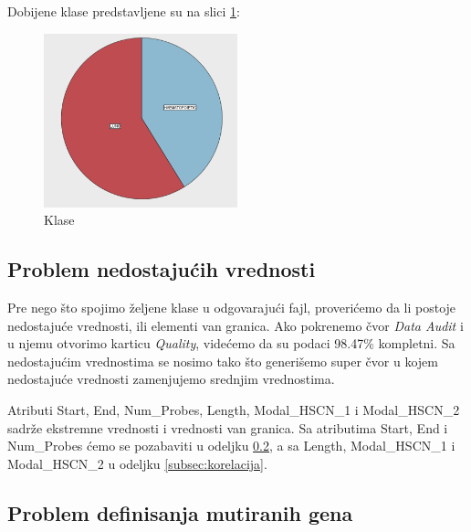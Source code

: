 \documentclass[a4paper]{article}
\begin{document}


Dobijene klase predstavljene su na slici \ref{fig:classes2}:
\begin{figure}[ht!]
                \centering
                \includegraphics[width=0.5\textwidth]{classes_2.PNG}
                \caption{Klase}
                \label{fig:classes2}
            \end{figure}


\subsection{Problem nedostajućih vrednosti}
\label{subsec:nedostajuce}

Pre nego što spojimo željene klase u odgovarajući fajl, proverićemo da li postoje nedostajuće vrednosti, ili elementi van granica. Ako pokrenemo čvor \textit{Data Audit} i u njemu otvorimo karticu \textit{Quality}, videćemo da su podaci 98.47\% kompletni. Sa nedostajućim vrednostima se nosimo tako što generišemo super čvor u kojem nedostajuće vrednosti zamenjujemo srednjim vrednostima.

Atributi Start, End, Num\_Probes, Length, Modal\_HSCN\_1 i Modal\_HSCN\_2 sadrže ekstremne vrednosti i vrednosti van granica. Sa atributima Start, End i Num\_Probes ćemo se pozabaviti u odeljku \ref{subsec:geni}, a sa Length, Modal\_HSCN\_1 i Modal\_HSCN\_2 u odeljku \ref{subsec:korelacija}.

\subsection{Problem definisanja mutiranih gena}
\label{subsec:geni}
\end{document}
